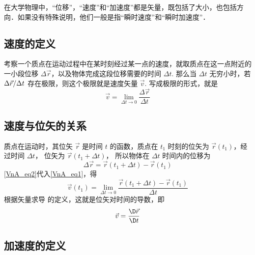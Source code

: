 

在大学物理中，“位移”，“速度”和“加速度”都是矢量，既包括了大小，也包括方向．如果没有特殊说明，他们一般是指“瞬时速度”和“瞬时加速度”．

\subsection{速度的定义}
考察一个质点在运动过程中在某时刻经过某一点的速度，就取质点在这一点附近的一小段位移 $\Delta\vec r$，以及物体完成这段位移需要的时间 $\Delta t$. 那么当 $\Delta t$ 无穷小时，若 ${{\Delta \vec r} \mathord{\left/
 {\vphantom {{\Delta \vec s} {\Delta t}}} \right.
 \kern-\nulldelimiterspace} {\Delta t}}$ 存在极限，则这个极限就是速度矢量 $\vec v$. 写成极限的形式，就是
\begin{equation}\label{VnA_eq1}
\vec v = \mathop {\lim }\limits_{\Delta t \to 0} \frac{{\Delta \vec r}}{{\Delta t}}
\end{equation}

\subsection{速度与位矢的关系}

质点在运动时，其位矢 $\vec r$ 是时间 $t$ 的函数，质点在 ${t_1}$ 时刻的位矢为 $\vec r\left( {{t_1}} \right)$，经过时间 $\Delta t$， 位矢为 $\vec r\left( {{t_1} + \Delta t} \right)$， 所以物体在 $\Delta t$ 时间内的位移为
\begin{equation}\label{VnA_eq2}
\Delta \vec r = \vec r\left( {{t_1} + \Delta t} \right) - \vec r\left( {{t_1}} \right)
\end{equation}
\autoref{VnA_eq2}代入\autoref{VnA_eq1}，得
\begin{equation}\label{VnA_eq3}
\vec v(t_1) = \mathop {\lim }\limits_{\Delta t \to 0} \frac{{\vec r\left( {{t_1} + \Delta t} \right) - \vec r\left( {{t_1}} \right)}}{{\Delta t}}
\end{equation}
根据矢量求导 的定义，这就是位矢对时间的导数，即
\begin{equation}
\vec v = \frac{\D \vec r}{\D t}
\end{equation}


\subsection{加速度的定义}

